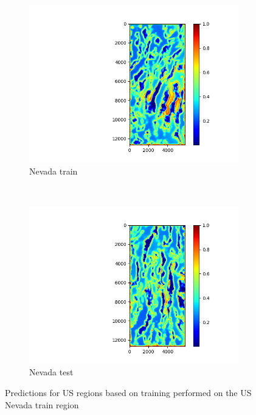 \documentclass[11pt,a4paper]{article}
\begin{document}
\begin{figure}[t]
    \centering
    \begin{subfigure}[b]{0.75\textwidth}
        \includegraphics[width=\textwidth]{graphics/training/train_on_6_features_01234/heatmaps_faults_6.png}
        \caption{Nevada train}
    \end{subfigure}
    ~
    \begin{subfigure}[b]{0.75\textwidth}
        \includegraphics[width=\textwidth]{graphics/training/train_on_6_features_01234/heatmaps_faults_7.png}
        \caption{Nevada test}
    \end{subfigure}
    \caption{Predictions for US regions based on training performed on the US Nevada train region}
    \label{fig:train_on_6_features_01234_no_additional_im_us}
\end{figure}
\end{document}
